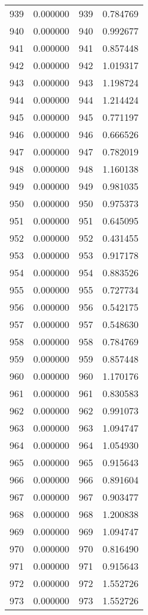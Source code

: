 \documentclass[12pt]{article}
\begin{document}
\begin{longtable}{@{}cccc@{}}
939 & 0.000000 & 939 & 0.784769 \\
940 & 0.000000 & 940 & 0.992677 \\
941 & 0.000000 & 941 & 0.857448 \\
942 & 0.000000 & 942 & 1.019317 \\
943 & 0.000000 & 943 & 1.198724 \\
944 & 0.000000 & 944 & 1.214424 \\
945 & 0.000000 & 945 & 0.771197 \\
946 & 0.000000 & 946 & 0.666526 \\
947 & 0.000000 & 947 & 0.782019 \\
948 & 0.000000 & 948 & 1.160138 \\
949 & 0.000000 & 949 & 0.981035 \\
950 & 0.000000 & 950 & 0.975373 \\
951 & 0.000000 & 951 & 0.645095 \\
952 & 0.000000 & 952 & 0.431455 \\
953 & 0.000000 & 953 & 0.917178 \\
954 & 0.000000 & 954 & 0.883526 \\
955 & 0.000000 & 955 & 0.727734 \\
956 & 0.000000 & 956 & 0.542175 \\
957 & 0.000000 & 957 & 0.548630 \\
958 & 0.000000 & 958 & 0.784769 \\
959 & 0.000000 & 959 & 0.857448 \\
960 & 0.000000 & 960 & 1.170176 \\
961 & 0.000000 & 961 & 0.830583 \\
962 & 0.000000 & 962 & 0.991073 \\
963 & 0.000000 & 963 & 1.094747 \\
964 & 0.000000 & 964 & 1.054930 \\
965 & 0.000000 & 965 & 0.915643 \\
966 & 0.000000 & 966 & 0.891604 \\
967 & 0.000000 & 967 & 0.903477 \\
968 & 0.000000 & 968 & 1.200838 \\
969 & 0.000000 & 969 & 1.094747 \\
970 & 0.000000 & 970 & 0.816490 \\
971 & 0.000000 & 971 & 0.915643 \\
972 & 0.000000 & 972 & 1.552726 \\
973 & 0.000000 & 973 & 1.552726 \\

\end{longtable}
\end{document}

